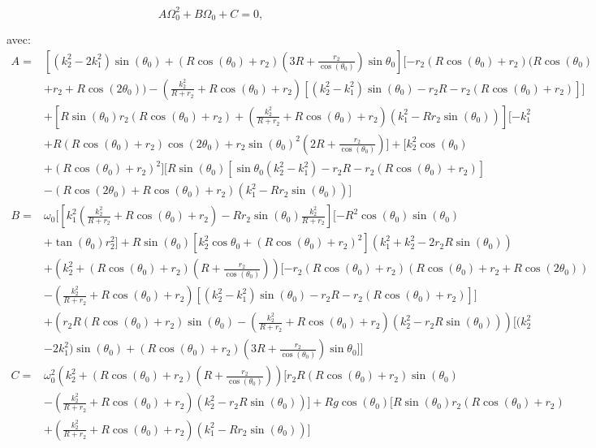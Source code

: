 \begin{equation}
    A\Omega_0^2+B\Omega_0+C=0,
\end{equation}

avec:
\begin{align}
    A=&[(k_2^2-2 k_1^2)  \sin(\theta_0)+ (R \cos(\theta_0)+r_2)(3R+\frac{r_2}{\cos(\theta_0)}) \sin{\theta_0}][-r_2 (R\cos(\theta_0)+r_2) (R\cos(\theta_0) \nonumber\\
    &+r_2+R\cos(2\theta_0))-(\frac{k_2^2}{R+r_2} + R\cos(\theta_0)+r_2)[(k_2^2-k_1^2)\sin(\theta_0) -r_2 R -r_2(R\cos(\theta_0)+r_2)]]\nonumber\\
    &+[R \sin(\theta_0)r_2 (R\cos(\theta_0)+r_2)+(\frac{k_2^2}{R+r_2} + R\cos(\theta_0)+r_2)(k_1^2-R r_2 \sin(\theta_0))][-k_1^2  \nonumber\\
    &+ R(R\cos(\theta_0)+r_2)\cos(2\theta_0) +  r_2\sin(\theta_0)^2 (2R+\frac{r_2}{\cos(\theta_0)}) ]+[k_2^2  \cos(\theta_0) \nonumber\\
    &+(R\cos(\theta_0)+r_2)^2][R \sin(\theta_0)[ \sin{\theta_0}(k_2^2-k_1^2) -r_2 R  -r_2(R\cos(\theta_0)+r_2)]\nonumber\\
    &-(R\cos(2\theta_0)+ R\cos(\theta_0)+r_2)(k_1^2-R r_2 \sin(\theta_0))] \nonumber\\
    B=&\omega_0[[k_1^2(\frac{k_2^2}{R+r_2} + R\cos(\theta_0)+r_2)-R r_2 \sin(\theta_0)\frac{k_2^2}{R+r_2}
    ][- R^2\cos(\theta_0)\sin(\theta_0)\nonumber\\
    &+ \tan(\theta_0) r_2^2 ]+R \sin(\theta_0)[k_2^2  \cos{\theta_0} +(R\cos(\theta_0)+r_2)^2](k_1^2+k_2^2 -2r_2 R\sin(\theta_0))\nonumber\\
    &+ (k_2^2 +(R \cos(\theta_0)+r_2)(R+\frac{r_2}{\cos(\theta_0)}) )[-r_2 (R\cos(\theta_0)+r_2) (R\cos(\theta_0)+r_2+R\cos(2\theta_0))\nonumber\\
    &-(\frac{k_2^2}{R+r_2} + R\cos(\theta_0)+r_2)[(k_2^2-k_1^2)\sin(\theta_0) -r_2 R -r_2(R\cos(\theta_0)+r_2)]]\nonumber\\
    &+(r_2R(R\cos(\theta_0)+r_2) \sin(\theta_0)-(\frac{k_2^2}{R+r_2} + R\cos(\theta_0)+r_2)(k_2^2-r_2 R\sin(\theta_0)))[(k_2^2\nonumber\\
    &-2 k_1^2)  \sin(\theta_0)+ (R \cos(\theta_0)+r_2)(3R+\frac{r_2}{\cos(\theta_0)}) \sin{\theta_0}]]\nonumber\\
    C=&\omega_0^2(k_2^2 +(R \cos(\theta_0)+r_2)(R+\frac{r_2}{\cos(\theta_0)}) )[r_2R(R\cos(\theta_0)+r_2) \sin(\theta_0)\nonumber\\
    &-(\frac{k_2^2}{R+r_2} + R\cos(\theta_0)+r_2)(k_2^2-r_2 R\sin(\theta_0))]+R g\cos(\theta_0)[R \sin(\theta_0)r_2 (R\cos(\theta_0)+r_2)\nonumber\\
    &+(\frac{k_2^2}{R+r_2} + R\cos(\theta_0)+r_2)(k_1^2-R r_2 \sin(\theta_0))]
\label{eq:b32}
\end{align}

